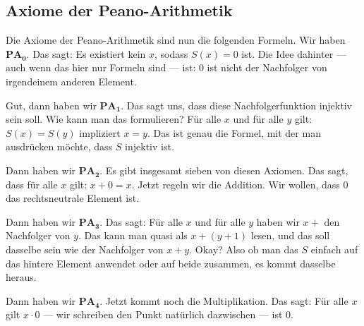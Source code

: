 \subsection{Axiome der Peano-Arithmetik}
\begin{spoken-clean}[00:07:37 - 00:11:00]
Die Axiome der Peano-Arithmetik sind nun die folgenden Formeln. Wir haben $\textbf{PA}_{\textbf{0}}$. Das sagt: Es existiert kein $x$, sodass $S(x) = 0$ ist. Die Idee dahinter --- auch wenn das hier nur Formeln sind --- ist: $0$ ist nicht der Nachfolger von irgendeinem anderen Element.

Gut, dann haben wir $\textbf{PA}_{\textbf{1}}$. Das sagt uns, dass diese Nachfolgerfunktion injektiv sein soll. Wie kann man das formulieren? Für alle $x$ und für alle $y$ gilt: $S(x) = S(y)$ impliziert $x = y$. Das ist genau die Formel, mit der man ausdrücken möchte, dass $S$ injektiv ist.

Dann haben wir $\textbf{PA}_{\textbf{2}}$. Es gibt insgesamt sieben von diesen Axiomen. Das sagt, dass für alle $x$ gilt: $x + 0 = x$. Jetzt regeln wir die Addition. Wir wollen, dass $0$ das rechtsneutrale Element ist.

Dann haben wir $\textbf{PA}_{\textbf{3}}$. Das sagt: Für alle $x$ und für alle $y$ haben wir $x +$ den Nachfolger von $y$. Das kann man quasi als $x + (y + 1)$ lesen, und das soll dasselbe sein wie der Nachfolger von $x + y$. Okay? Also ob man das $S$ einfach auf das hintere Element anwendet oder auf beide zusammen, es kommt dasselbe heraus.

Dann haben wir $\textbf{PA}_{\textbf{4}}$. Jetzt kommt noch die Multiplikation. Das sagt: Für alle $x$ gilt $x \cdot 0$ --- wir schreiben den Punkt natürlich dazwischen --- ist $0$.
\end{spoken-clean}

